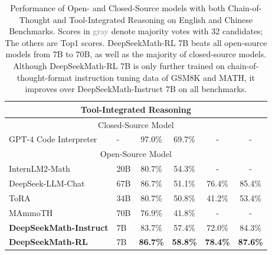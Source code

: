 \begin{table}[t!]
{\begin{tabular}{llcccc}
\midrule
\midrule
\multicolumn{6}{c}{\textbf{Tool-Integrated Reasoning}}                                                                                                                          \\ 
\midrule
\multicolumn{6}{c}{Closed-Source Model}                                                                                                                                         \\ 
\midrule
GPT-4 Code Interpreter &   -   & 97.0\%                         & 69.7\%          &            -     &          -                                                      \\ 
\midrule
\multicolumn{6}{c}{Open-Source Model}                                                                                                                                           \\ 
\midrule
InternLM2-Math & 20B           & 80.7\%                         & 54.3\%          &          -       &      -                                                               \\
DeepSeek-LLM-Chat & 67B        & 86.7\%                & 51.1\%          & 76.4\%          & 85.4\%                                                            \\
ToRA & 34B                     & 80.7\%                         & 50.8\%          & 41.2\%          & 53.4\%                                                              \\
MAmmoTH & 70B                  & 76.9\%                         & 41.8\%          &          -       &            -                                                         \\ 
\midrule
\textbf{DeepSeekMath-Instruct} & 7B     & 83.7\%                         & 57.4\%          & 72.0\%          & 84.3\%                                                                \\
\textbf{DeepSeekMath-RL} & 7B           & \textbf{86.7\%}                         & \textbf{58.8\%} & \textbf{78.4\%} & \textbf{87.6\%}                                                       \\
\bottomrule
\end{tabular}
}
    \caption{
   Performance of Open- and Closed-Source models with both Chain-of-Thought and Tool-Integrated Reasoning on English and Chinese Benchmarks. Scores in \textcolor{gray}{gray} denote majority votes with 32 candidates; The others are Top1 scores. DeepSeekMath-RL 7B beats all open-source models from 7B to 70B, as well as the majority of closed-source models. Although DeepSeekMath-RL 7B is only further trained on chain-of-thought-format instruction tuning data of GSM8K and MATH, it improves over DeepSeekMath-Instruct 7B on all benchmarks. }
    \label{tab:sft_rl_math}
\end{table}

